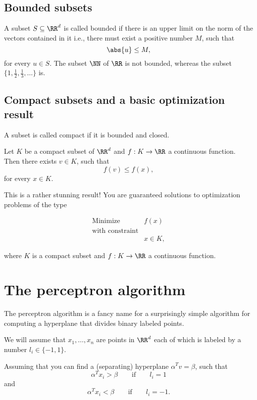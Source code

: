 \documentclass{article}
\begin{document}
\subsection{Bounded subsets}

A subset $S \subseteq \RR^d$ is called bounded if there is an upper limit on the norm
of the vectors contained in it i.e., there must exist a  positive number $M$, such that
$$
\abs{u}\leq M,
$$
for every $u\in S$. The subset $\NN$ of $\RR$ is not bounded, whereas the subset
$\{1, \frac{1}{2}, \frac{1}{3}, \dots\}$ is.




\subsection{Compact subsets and a basic optimization result}\label{sectcompact}

A subset is called compact if it is bounded and closed.


\begin{theorem}[emph]
  Let $K$ be a compact subset of $\RR^d$ and $f: K\rightarrow \RR$
  a continuous function. Then there exists $v\in K$, such that
  $$
  f(v) \leq f(x),
  $$
  for every $x\in K$.
\end{theorem}

This is a rather stunning result! You are guaranteed solutions to
optimization problems of the type

\begin{align*}
  &\text{Minimize} &f(x)&\\
  &\text{with constraint}\\
  &&x\in K,
\end{align*}

where $K$ is a compact subset and $f: K\rightarrow \RR$ a continuous function.



\section{The perceptron algorithm}\label{sectperceptron}


The perceptron algorithm is a fancy name for a surprisingly simple
algorithm for computing a hyperplane that divides binary labeled
points.

We will assume that $x_1, \dots, x_n$ are
points in $\RR^d$ each of which is labeled by
a number $l_i\in \{-1, 1\}$.

Assuming that you can find a (separating) hyperplane $\alpha^T v = \beta$,
such that
$$
\alpha^T x_i > \beta\qquad\text{if}\qquad l_i = 1
$$
and
$$
\alpha^T x_i < \beta\qquad\text{if}\qquad l_i = -1.
$$
\end{document}
